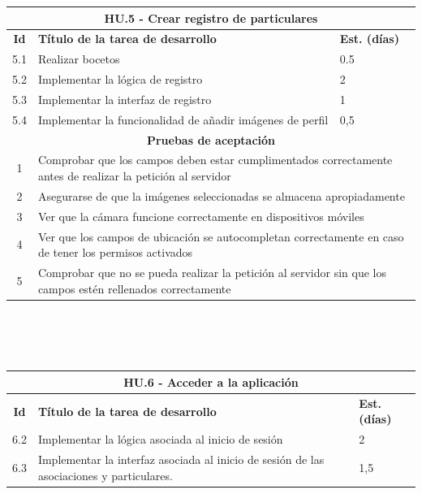 \begin{tabular}{|c|p{9.5cm}|p{1cm}|}
	\hline
	\multicolumn{3}{|c|}{\textbf{HU.5 - Crear registro de particulares}} \\
	\hline
	\textbf{Id} & \textbf{Título de la tarea de desarrollo} & \textbf{Est. (días)} \\
	\hline
	5.1 & Realizar bocetos & 0.5 \\ \hline
	5.2 &  Implementar la lógica de registro & 2 \\ \hline
	5.3 &  Implementar la interfaz de registro & 1 \\ \hline
	5.4 &  Implementar la funcionalidad de añadir imágenes de perfil & 0,5 \\ \hline
	\multicolumn{3}{|c|}{\textbf{Pruebas de aceptación}} \\ \hline
	1 & \multicolumn{2}{|p{10cm}|}{Comprobar que los campos deben estar cumplimentados correctamente antes de realizar la petición al servidor} \\ \hline
	2 & \multicolumn{2}{|p{10cm}|}{Asegurarse de que la imágenes seleccionadas se almacena apropiadamente} \\ \hline
	3 & \multicolumn{2}{|p{10cm}|}{Ver que la cámara funcione correctamente en dispositivos móviles} \\ \hline
	4 & \multicolumn{2}{|p{10cm}|}{Ver que los campos de ubicación se autocompletan correctamente en caso de tener los permisos activados} \\ 
	5 & \multicolumn{2}{|p{10cm}|}{Comprobar que no se pueda realizar la petición al servidor sin que los campos estén rellenados correctamente} \\\hline
\end{tabular} \\ \\\\

\begin{tabular}{|c|p{9.5cm}|p{1cm}|}
	\hline
	\multicolumn{3}{|c|}{\textbf{HU.6 - Acceder a la aplicación}} \\
	\hline
	\textbf{Id} & \textbf{Título de la tarea de desarrollo} & \textbf{Est. (días)} \\
	\hline
	6.2 &  Implementar la lógica asociada al inicio de sesión & 2 \\ \hline
	6.3 &  Implementar la interfaz asociada al inicio de sesión de las asociaciones y particulares. & 1,5 \\ \hline
	
\end{tabular} \\ \\

